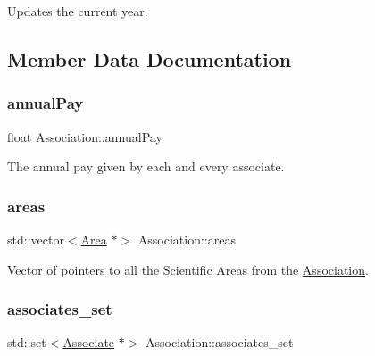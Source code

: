 Updates the current year. 



\subsection{Member Data Documentation}
\mbox{\label{classAssociation_a19f8a7aad1491bc14f558b0b852da0a4}} 
\subsubsection{\texorpdfstring{annual\+Pay}{annualPay}}
{\footnotesize\ttfamily float Association\+::annual\+Pay\hspace{0.3cm}{\ttfamily [private]}}



The annual pay given by each and every associate. 

\mbox{\label{classAssociation_a6e0125297a1927aae76d14710fc02862}} 
\subsubsection{\texorpdfstring{areas}{areas}}
{\footnotesize\ttfamily std\+::vector$<$\mbox{\hyperlink{classArea}{Area}} $\ast$$>$ Association\+::areas\hspace{0.3cm}{\ttfamily [private]}}



Vector of pointers to all the Scientific Areas from the \mbox{\hyperlink{classAssociation}{Association}}. 

\mbox{\label{classAssociation_a3dad047d1eed00d6bc0bb371b30e3bd0}} 
\subsubsection{\texorpdfstring{associates\+\_\+set}{associates\_set}}
{\footnotesize\ttfamily std\+::set$<$\mbox{\hyperlink{classAssociate}{Associate}} $\ast$$>$ Association\+::associates\+\_\+set\hspace{0.3cm}{\ttfamily [private]}}



